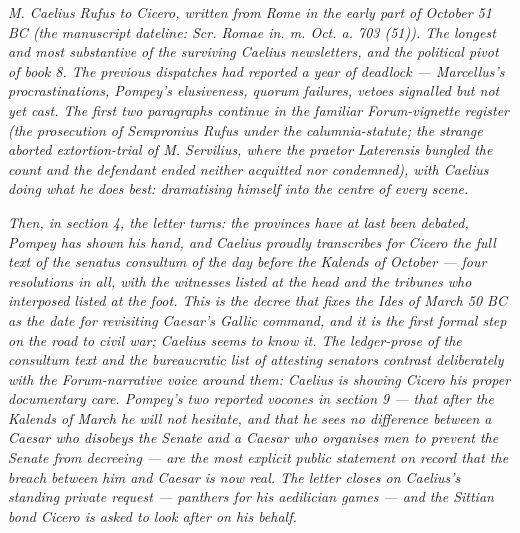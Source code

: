 
\textit{M. Caelius Rufus to Cicero, written from Rome
in the early part of October 51 BC (the manuscript
dateline: \textit{Scr. Romae in. m. Oct. a. 703 (51)}).
The longest and most substantive of the surviving
Caelius newsletters, and the political pivot of book 8.
The previous dispatches had reported a year of
deadlock --- Marcellus's procrastinations, Pompey's
elusiveness, quorum failures, vetoes signalled but not
yet cast. The first two paragraphs continue in the
familiar Forum-vignette register (the prosecution of
Sempronius Rufus under the calumnia-statute; the
strange aborted extortion-trial of M. Servilius, where
the praetor Laterensis bungled the count and the
defendant ended neither acquitted nor condemned), with
Caelius doing what he does best: dramatising himself
into the centre of every scene.}

\textit{Then, in section 4, the letter turns: the
provinces have at last been debated, Pompey has shown
his hand, and Caelius proudly transcribes for Cicero
the full text of the senatus consultum of the day
before the Kalends of October --- four resolutions
in all, with the witnesses listed at the head and the
tribunes who interposed listed at the foot. This is the
decree that fixes the Ides of March 50 BC as the date
for revisiting Caesar's Gallic command, and it is the
first formal step on the road to civil war; Caelius
seems to know it. The ledger-prose of the consultum
text and the bureaucratic list of attesting senators
contrast deliberately with the Forum-narrative voice
around them: Caelius is showing Cicero his proper
documentary care. Pompey's two reported \textit{vocones}
in section 9 --- that after the Kalends of March he
will not hesitate, and that he sees no difference
between a Caesar who disobeys the Senate and a Caesar
who organises men to prevent the Senate from decreeing
--- are the most explicit public statement on record
that the breach between him and Caesar is now real.
The letter closes on Caelius's standing private
request --- panthers for his aedilician games --- and
the Sittian bond Cicero is asked to look after on his
behalf.}
